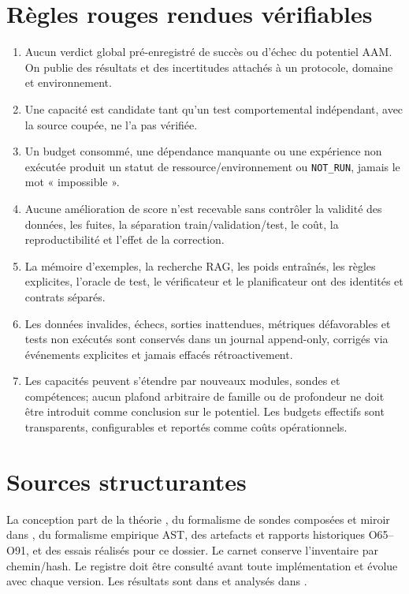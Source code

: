 \documentclass[11pt,a4paper]{report}
\begin{document}
\section{Règles rouges rendues vérifiables}
\begin{enumerate}[leftmargin=1.6em]
\item Aucun verdict global pré-enregistré de succès ou d'échec du potentiel AAM. On publie des résultats et des incertitudes attachés à un protocole, domaine et environnement.
\item Une capacité est candidate tant qu'un test comportemental indépendant, avec la source coupée, ne l'a pas vérifiée.
\item Un budget consommé, une dépendance manquante ou une expérience non exécutée produit un statut de ressource/environnement ou \texttt{NOT\_RUN}, jamais le mot « impossible ».
\item Aucune amélioration de score n'est recevable sans contrôler la validité des données, les fuites, la séparation train/validation/test, le coût, la reproductibilité et l'effet de la correction.
\item La mémoire d'exemples, la recherche RAG, les poids entraînés, les règles explicites, l'oracle de test, le vérificateur et le planificateur ont des identités et contrats séparés.
\item Les données invalides, échecs, sorties inattendues, métriques défavorables et tests non exécutés sont conservés dans un journal append-only, corrigés via événements explicites et jamais effacés rétroactivement.
\item Les capacités peuvent s'étendre par nouveaux modules, sondes et compétences; aucun plafond arbitraire de famille ou de profondeur ne doit être introduit comme conclusion sur le potentiel. Les budgets effectifs sont transparents, configurables et reportés comme coûts opérationnels.
\end{enumerate}

\section{Sources structurantes}
La conception part de la théorie , du formalisme de sondes composées et miroir dans , du formalisme empirique AST, des artefacts et rapports historiques O65--O91, et des essais réalisés pour ce dossier. Le carnet  conserve l'inventaire par chemin/hash. Le registre  doit être consulté avant toute implémentation et évolue avec chaque version. Les résultats sont dans  et analysés dans .
\end{document}

